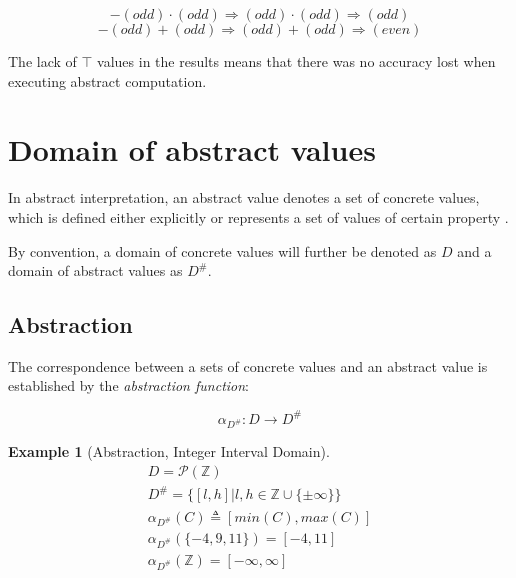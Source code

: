 \documentclass[12pt,oneside]{fithesis2}
\theoremstyle{definition}
\newtheorem{exmp}{Example}[section]
\begin{document}
\[ -(odd) \cdot (odd) \Rightarrow (odd) \cdot (odd) \Rightarrow (odd) \]
\[ -(odd) + (odd) \Rightarrow (odd) + (odd) \Rightarrow (even) \]

The lack of $\top$ values in the results means that there was no accuracy lost when executing abstract computation.

\section{Domain of abstract values}\label{sec:domains}

In abstract interpretation, an abstract value denotes a set of concrete values, which is defined either explicitly or represents a set of values of certain property \cite{CousotCousot76-1}.

By convention, a domain of concrete values will further be denoted as $D$ and a domain of abstract values as $D^\#$.

\subsection{Abstraction}

The correspondence between a sets of concrete values and an abstract value is established by the \textit{abstraction function}: \cite{CousotCousot76-1}

\[
\alpha_{D^\#}\colon D \to D^\#
\]

\begin{exmp}[Abstraction, Integer Interval Domain\cite{mine-WING12}]
  \begin{gather*}
    D = \mathcal P(\mathbb Z)\\
    D^\# = \{[l,h] | l,h \in \mathbb{Z} \cup \{\pm\infty\}\}\\
    \alpha_{D^\#}(C) \triangleq [min(C), max(C)]\\
    \alpha_{D^\#}(\{-4, 9, 11\}) = [-4, 11]\\
    \alpha_{D^\#}(\mathbb Z) = [-\infty, \infty]
  \end{gather*}
\end{exmp}
\end{document}
